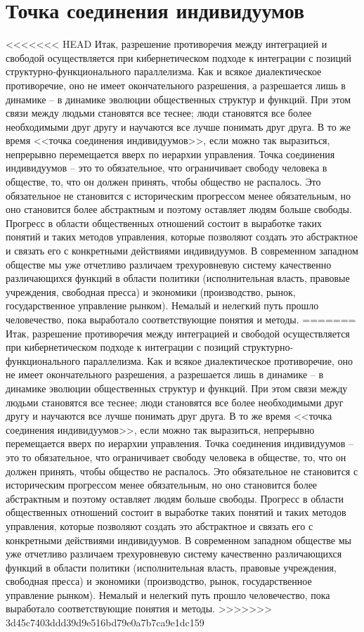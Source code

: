 \documentclass{book}
\begin{document}
\section{Точка соединения индивидуумов}

<<<<<<< HEAD
Итак, разрешение противоречия между интеграцией и свободой осуществляется при кибернетическом подходе к интеграции с позиций структурно‑функционального параллелизма. Как и всякое диалектическое противоречие, оно не имеет окон­чательного разрешения, а разрешается лишь в динамике -- в динамике эволюции общественных структур и функций. При этом связи между людьми становятся все теснее; люди становятся все более необходимыми друг другу и научаются все лучше понимать друг друга. В то же время <<точка соединения индивидуумов>>, если можно так выразиться, непрерывно перемещается вверх по иерархии управления. Точка соединения индивидуумов -- это то обязательное, что ограничивает свободу человека в обществе, то, что он должен принять, чтобы общество не распалось. Это обязательное не становится с историческим прогрессом менее обязательным, но оно становится более абстрактным  и поэтому оставляет людям больше свободы. Прогресс в области общественных отношений состоит в выработке таких понятий и таких методов управления, которые позволяют создать это абстрактное и связать его с конкретными действиями индивидуумов. В современном западном обществе мы уже отчетливо различаем трехуровневую систему качественно различающихся функций в области политики (исполни­тельная власть, правовые учреждения, свободная пресса) и эко­номики (производство, рынок, государственное управление рынком). Немалый и нелегкий путь прошло человечество, пока выработало соответствующие понятия и методы.
=======
Итак, разрешение противоречия между интеграцией и свободой осуществляется при кибернетическом подходе к интеграции с позиций структурно-функционального параллелизма. Как и всякое диалектическое противоречие, оно не имеет окон­чательного разрешения, а разрешается лишь в динамике -- в динамике эволюции общественных структур и функций. При этом связи между людьми становятся все теснее; люди становятся все более необходимыми друг другу и научаются все лучше понимать друг друга. В то же время <<точка соединения индивидуумов>>, если можно так выразиться, непрерывно перемещается вверх по иерархии управления. Точка соединения индивидуумов -- это то обязательное, что ограничивает свободу человека в обществе, то, что он должен принять, чтобы общество не распалось. Это обязательное не становится с историческим прогрессом менее обязательным, но оно становится более абстрактным  и поэтому оставляет людям больше свободы. Прогресс в области общественных отношений состоит в выработке таких понятий и таких методов управления, 
которые позволяют создать это абстрактное и связать его с конкретными действиями индивидуумов. В современном западном обществе мы уже отчетливо различаем трехуровневую систему качественно различающихся функций в области политики (исполни­тельная власть, правовые учреждения, свободная пресса) и эко­номики (производство, рынок, государственное управление рынком). Немалый и нелегкий путь прошло человечество, пока выработало соответствующие понятия и методы.
>>>>>>> 3d45c7403ddd39d9e516bd79e0a7b7ca9e1dc159
\end{document}
